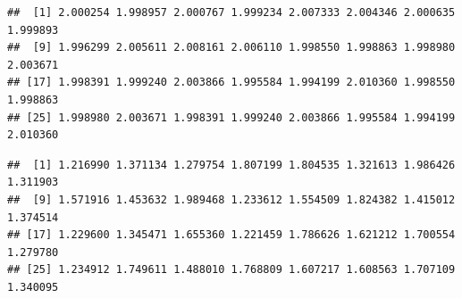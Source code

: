\documentclass[
]{krantz}
\makeatletter
\newenvironment{Shaded}{\begin{snugshade}}{\end{snugshade}}
\newcommand{\AttributeTok}[1]{\textcolor[rgb]{0.77,0.63,0.00}{#1}}
\newcommand{\CommentTok}[1]{\textcolor[rgb]{0.56,0.35,0.01}{\textit{#1}}}
\newcommand{\DecValTok}[1]{\textcolor[rgb]{0.00,0.00,0.81}{#1}}
\newcommand{\FloatTok}[1]{\textcolor[rgb]{0.00,0.00,0.81}{#1}}
\newcommand{\FunctionTok}[1]{\textcolor[rgb]{0.00,0.00,0.00}{#1}}
\newcommand{\NormalTok}[1]{#1}
\newcommand{\OtherTok}[1]{\textcolor[rgb]{0.56,0.35,0.01}{#1}}
\newcommand{\SpecialCharTok}[1]{\textcolor[rgb]{0.00,0.00,0.00}{#1}}
\newcommand{\StringTok}[1]{\textcolor[rgb]{0.31,0.60,0.02}{#1}}
\newenvironment{kframe}{%
\medskip{}
\setlength{\fboxsep}{.8em}
 \def\at@end@of@kframe{}%
 \ifinner\ifhmode%
  \def\at@end@of@kframe{\end{minipage}}%
  \begin{minipage}{\columnwidth}%
 \fi\fi%
 \def\FrameCommand##1{\hskip\@totalleftmargin \hskip-\fboxsep
 \colorbox{shadecolor}{##1}\hskip-\fboxsep
     \hskip-\linewidth \hskip-\@totalleftmargin \hskip\columnwidth}%
 \MakeFramed {\advance\hsize-\width
   \@totalleftmargin\z@ \linewidth\hsize
   \@setminipage}}%
 {\par\unskip\endMakeFramed%
 \at@end@of@kframe}
\renewenvironment{Shaded}{\begin{kframe}}{\end{kframe}}
\makeatother
\begin{document}
\begin{Shaded}
\end{Shaded}

\begin{verbatim}
##  [1] 2.000254 1.998957 2.000767 1.999234 2.007333 2.004346 2.000635 1.999893
##  [9] 1.996299 2.005611 2.008161 2.006110 1.998550 1.998863 1.998980 2.003671
## [17] 1.998391 1.999240 2.003866 1.995584 1.994199 2.010360 1.998550 1.998863
## [25] 1.998980 2.003671 1.998391 1.999240 2.003866 1.995584 1.994199 2.010360
\end{verbatim}

\begin{Shaded}
\end{Shaded}

\begin{verbatim}
##  [1] 1.216990 1.371134 1.279754 1.807199 1.804535 1.321613 1.986426 1.311903
##  [9] 1.571916 1.453632 1.989468 1.233612 1.554509 1.824382 1.415012 1.374514
## [17] 1.229600 1.345471 1.655360 1.221459 1.786626 1.621212 1.700554 1.279780
## [25] 1.234912 1.749611 1.488010 1.768809 1.607217 1.608563 1.707109 1.340095
\end{verbatim}
\end{document}
